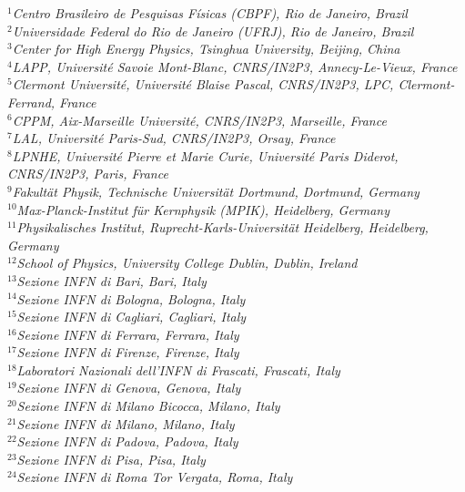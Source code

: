 \documentclass[12pt,a4paper]{article}
\begin{document}
\begin{flushleft}
{\footnotesize \it
$ ^{1}$Centro Brasileiro de Pesquisas F\'{i}sicas (CBPF), Rio de Janeiro, Brazil\\
$ ^{2}$Universidade Federal do Rio de Janeiro (UFRJ), Rio de Janeiro, Brazil\\
$ ^{3}$Center for High Energy Physics, Tsinghua University, Beijing, China\\
$ ^{4}$LAPP, Universit\'{e} Savoie Mont-Blanc, CNRS/IN2P3, Annecy-Le-Vieux, France\\
$ ^{5}$Clermont Universit\'{e}, Universit\'{e} Blaise Pascal, CNRS/IN2P3, LPC, Clermont-Ferrand, France\\
$ ^{6}$CPPM, Aix-Marseille Universit\'{e}, CNRS/IN2P3, Marseille, France\\
$ ^{7}$LAL, Universit\'{e} Paris-Sud, CNRS/IN2P3, Orsay, France\\
$ ^{8}$LPNHE, Universit\'{e} Pierre et Marie Curie, Universit\'{e} Paris Diderot, CNRS/IN2P3, Paris, France\\
$ ^{9}$Fakult\"{a}t Physik, Technische Universit\"{a}t Dortmund, Dortmund, Germany\\
$ ^{10}$Max-Planck-Institut f\"{u}r Kernphysik (MPIK), Heidelberg, Germany\\
$ ^{11}$Physikalisches Institut, Ruprecht-Karls-Universit\"{a}t Heidelberg, Heidelberg, Germany\\
$ ^{12}$School of Physics, University College Dublin, Dublin, Ireland\\
$ ^{13}$Sezione INFN di Bari, Bari, Italy\\
$ ^{14}$Sezione INFN di Bologna, Bologna, Italy\\
$ ^{15}$Sezione INFN di Cagliari, Cagliari, Italy\\
$ ^{16}$Sezione INFN di Ferrara, Ferrara, Italy\\
$ ^{17}$Sezione INFN di Firenze, Firenze, Italy\\
$ ^{18}$Laboratori Nazionali dell'INFN di Frascati, Frascati, Italy\\
$ ^{19}$Sezione INFN di Genova, Genova, Italy\\
$ ^{20}$Sezione INFN di Milano Bicocca, Milano, Italy\\
$ ^{21}$Sezione INFN di Milano, Milano, Italy\\
$ ^{22}$Sezione INFN di Padova, Padova, Italy\\
$ ^{23}$Sezione INFN di Pisa, Pisa, Italy\\
$ ^{24}$Sezione INFN di Roma Tor Vergata, Roma, Italy\\
}
\end{flushleft}
\end{document}
